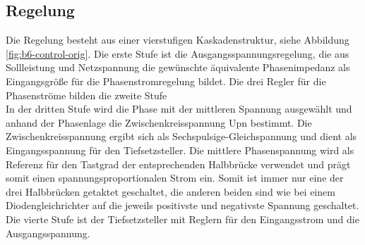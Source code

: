 		\subsection{Regelung}
			Die Regelung besteht aus einer vierstufigen Kaskadenstruktur, siehe Abbildung \ref{fig:b6-control-orig}. Die erste Stufe ist die Ausgangsspannungsregelung, die aus Sollleistung und Netzspannung die gewünschte äquivalente Phasenimpedanz als Eingangsgröße für die Phasenstromregelung bildet. Die drei Regler für die Phasenströme bilden die zweite Stufe\\
			In der dritten Stufe wird die Phase mit der mittleren Spannung ausgewählt und anhand der Phasenlage die Zwischenkreisspannung \gls{Upn} bestimmt. Die Zwischenkreisspannung ergibt sich als Sechspulsige-Gleichspannung und dient als Eingangsspannung für den Tiefsetzsteller. Die mittlere Phasenspannung wird als Referenz für den Tastgrad der entsprechenden Halbbrücke verwendet und prägt somit einen spannungsproportionalen Strom ein. Somit ist immer nur eine der drei Halbbrücken getaktet geschaltet, die anderen beiden sind wie bei einem Diodengleichrichter auf die jeweils positivste und negativste Spannung geschaltet.
			Die vierte Stufe ist der Tiefsetzsteller mit Reglern für den Eingangsstrom und die Ausgangsspannung.
				
